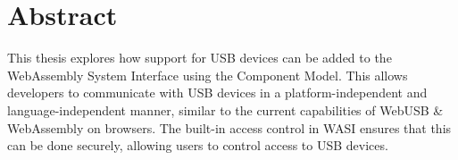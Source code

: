 \chapter*{Abstract}


This thesis explores how support for USB devices can be added to the WebAssembly System Interface using the Component Model. This allows developers to communicate with USB devices in a platform-independent and language-independent manner, similar to the current capabilities of WebUSB \& WebAssembly on browsers. The built-in access control in WASI ensures that this can be done securely, allowing users to control access to USB devices.
